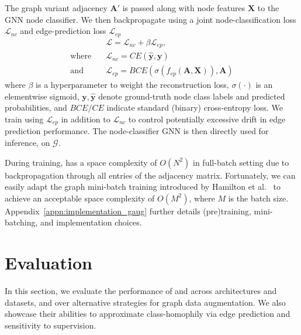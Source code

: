 \documentclass[letterpaper]{article} \usepackage{aaai21}  \usepackage{times}  \usepackage{helvet} \usepackage{courier}  \usepackage[hyphens]{url}  \usepackage{graphicx} \urlstyle{rm} \def\UrlFont{\rm}  \usepackage{natbib}  \usepackage{caption} \frenchspacing  \setlength{\pdfpagewidth}{8.5in}  \setlength{\pdfpageheight}{11in}
\begin{document}
The graph variant adjacency $\mathbf{A}'$ is passed along with node features $\mathbf{X}$ to the GNN node classifier. We then backpropagate using a joint node-classification loss $\mathcal{L}_{nc}$ and edge-prediction loss $\mathcal{L}_{ep}$
\begin{equation}
    \begin{aligned}
    &\mathcal{L} = \mathcal{L}_{nc} + \beta \mathcal{L}_{ep}, \\
    \mbox{where} \quad & \mathcal{L}_{nc} = CE(\mathbf{\hat{y}}, \mathbf{y}) \\ 
    \mbox{and} \quad & \mathcal{L}_{ep} = BCE(\sigma(f_{ep}(\mathbf{A}, \mathbf{X})), \mathbf{A})
\end{aligned}
\end{equation}
where $\beta$ is a hyperparameter to weight the reconstruction loss,  $\sigma(\cdot)$ is an elementwise sigmoid, $\mathbf{y}, \mathbf{\hat{y}}$ denote ground-truth node class labels and predicted probabilities, and $BCE/CE$ indicate standard (binary) cross-entropy loss. We train using $\mathcal{L}_{ep}$ in addition to $\mathcal{L}_{nc}$ to control potentially excessive drift in edge prediction performance. The node-classifier GNN is then directly used for inference, on $\mathcal{G}$. 

During training, \method has a space complexity of $O(N^2)$ in full-batch setting due to backpropagation through all entries of the adjacency matrix.  Fortunately, we can easily adapt the graph mini-batch training introduced by Hamilton et al.~\cite{hamilton2017inductive} to achieve an acceptable space complexity of $O(M^2)$, where $M$ is the batch size. Appendix~\ref{appn:implementation_gaug} further details (pre)training, mini-batching, and implementation choices. 

 
\section{Evaluation}
\label{sec:experiment}
In this section, we evaluate the performance of \methodtwo and \method across architectures and datasets, and over alternative strategies for graph data augmentation.  We also showcase their abilities to approximate class-homophily via edge prediction and  sensitivity to supervision.
\end{document}

